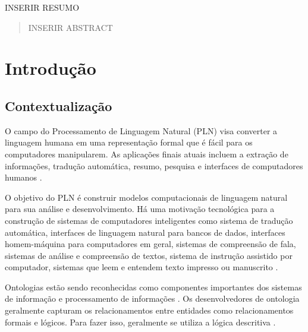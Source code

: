 \documentclass{bcc}
\begin{document}

\capa



\begin{resumo}
INSERIR RESUMO
\end{resumo}

\begin{abstract}
INSERIR ABSTRACT
\end{abstract}

\renewcommand\contentsname{\centerline{Sumário}}
\renewcommand\listfigurename{\centerline{Lista de Figuras}}
\renewcommand\listtablename{\centerline{Lista de Tabelas}}

\tableofcontents

\listoffigures
{}

\listoftables
{}

\inicio
\chapter{Introdução}

\section {Contextualização}

O campo do Processamento de Linguagem Natural (PLN) visa converter a linguagem humana em uma representação formal que é fácil para os computadores manipularem. As aplicações finais atuais incluem a extração de informações, tradução automática, resumo, pesquisa e interfaces de computadores humanos \cite{collobert2008}.

O objetivo do PLN é construir modelos computacionais de linguagem natural para sua análise e desenvolvimento. Há uma motivação tecnológica para a construção de sistemas de computadores inteligentes como sistema de tradução automática, interfaces de linguagem natural para bancos de dados, interfaces homem-máquina para computadores em geral, sistemas de compreensão de fala, sistemas de análise e compreensão de textos, sistema de instrução assistido por computador, sistemas que leem e entendem texto impresso ou manuscrito \cite{bharati1995}.

Ontologias estão sendo reconhecidas como componentes importantes dos sistemas de informação e processamento de informações \cite{estival2004}. Os desenvolvedores de ontologia geralmente capturam os relacionamentos entre entidades como relacionamentos formais e lógicos. Para fazer isso, geralmente se utiliza a lógica descritiva \cite{liu2011}.
\end{document}

